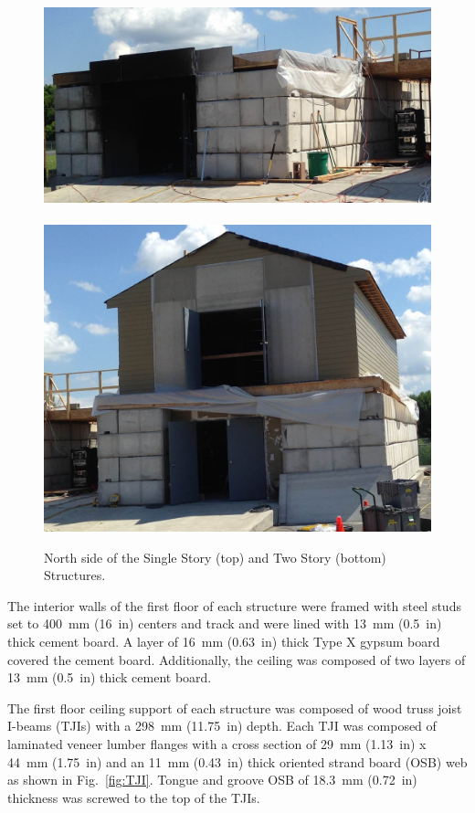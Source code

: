 \documentclass[12pt,oneside]{book}
\begin{document}
\begin{figure}[!ht]
	\includegraphics[width=5.25in]{../Figures/Pictures/east_structure}
	\\~\\
	\includegraphics[width=5.25in]{../Figures/Pictures/west_structure}
	\caption[North side of the Single Story and Two Story Structures.]{North side of the Single Story (top) and Two Story (bottom) Structures.}
	\label{fig:struct_pics}
\end{figure}

The interior walls of the first floor of each structure were framed with steel studs set to 400~mm (16~in) centers and track and were lined with 13~mm (0.5~in) thick cement board. A layer of 16~mm (0.63~in) thick Type X gypsum board covered the cement board. Additionally, the ceiling was composed of two layers of 13~mm (0.5~in) thick cement board.
\FloatBarrier

The first floor ceiling support of each structure was composed of wood truss joist I-beams (TJIs) with a 298~mm (11.75~in) depth. Each TJI was composed of laminated veneer lumber flanges with a cross section of 29~mm (1.13~in) x 44~mm (1.75~in) and an 11~mm (0.43~in) thick oriented strand board (OSB) web as shown in Fig.~\ref{fig:TJI}. Tongue and groove OSB of 18.3~mm (0.72~in) thickness was screwed to the top of the TJIs.
\end{document}
